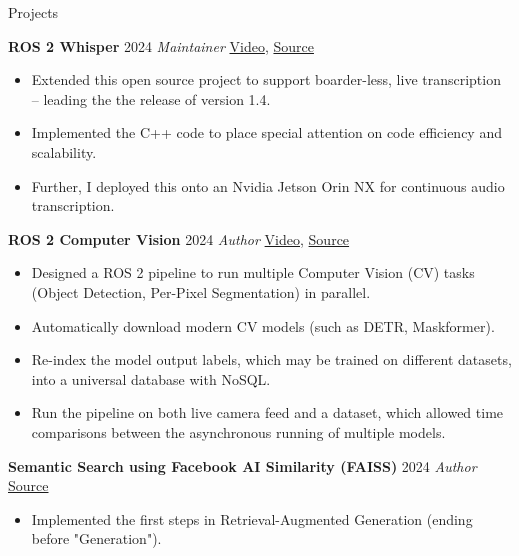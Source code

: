 \begin{rubric}{Projects}

\entry*[] \textbf{ROS 2 Whisper} \hfill 2024 \newline
\emph{Maintainer} \hfill  \href{https://github.com/ros-ai/ros2_whisper/blob/main/doc/harry_potter_sample.gif}{Video}, \href{https://github.com/ros-ai/ros2_whisper}{\faGithub Source} \newline
\vspace{\CVItemizeHeaderSpacing} \begin{itemize}[leftmargin=*, rightmargin=1cm]
	\setlength{\itemsep}{\CVItemizeSpacing}
	\item Extended this open source project to support boarder-less, live transcription -- leading the the release of version 1.4.
	\item Implemented the C++ code to place special attention on code efficiency and scalability.
	\item Further, I deployed this onto an Nvidia Jetson Orin NX for continuous audio transcription.
\end{itemize}

\entry*[] \textbf{ROS 2 Computer Vision} \hfill 2024 \newline
\emph{Author} \hfill \href{https://github.com/NathanCorral/ROS-HF-Vision/blob/main/doc/gifs/ex_german_roads.gif}{Video}, \href{https://github.com/NathanCorral/ROS-HF-Vision/tree/main}{\faGithub Source} \newline
\vspace{\CVItemizeHeaderSpacing} \begin{itemize}[leftmargin=*, rightmargin=1cm]
	\setlength{\itemsep}{\CVItemizeSpacing}
	\item Designed a ROS 2 pipeline to run multiple Computer Vision (CV) tasks (Object Detection, Per-Pixel Segmentation) in parallel.  
	\item Automatically download modern CV models (such as DETR, Maskformer).  
	\item Re-index the model output labels, which may be trained on different datasets, into a universal database with NoSQL.  
	\item Run the pipeline on both live camera feed and a dataset, which allowed time comparisons between the asynchronous running of multiple models.
\end{itemize}

\entry*[] \textbf{Semantic Search using Facebook AI Similarity (FAISS)} \hfill 2024 \newline \emph{Author} \hfill \href{https://github.com/NathanCorral/Hugging-Face-FAISS-Semantic-Search}{\faGithub Source} \newline
\vspace{\CVItemizeHeaderSpacing} \begin{itemize}[leftmargin=*, rightmargin=1cm]
	\setlength{\itemsep}{\CVItemizeSpacing}
	\item Implemented the first steps in Retrieval-Augmented Generation (ending before "Generation").
\end{itemize}


\end{rubric}
